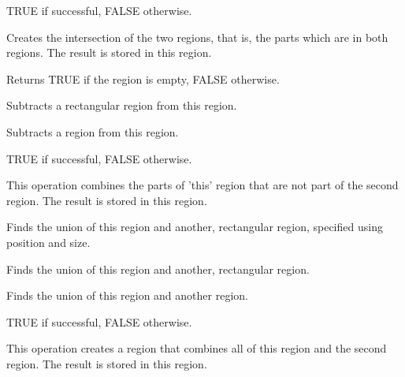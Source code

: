 TRUE if successful, FALSE otherwise.


Creates the intersection of the two regions, that is, the parts which are in both regions. The result
is stored in this region.

\label{wxregionisempty}



Returns TRUE if the region is empty, FALSE otherwise.


Subtracts a rectangular region from this region.


Subtracts a region from this region.


TRUE if successful, FALSE otherwise.


This operation combines the parts of 'this' region that are not part of the second region.
The result is stored in this region.

\label{wxregionunion}


Finds the union of this region and another, rectangular region, specified using position and size.


Finds the union of this region and another, rectangular region.


Finds the union of this region and another region.


TRUE if successful, FALSE otherwise.


This operation creates a region that combines all of this region and the second region.
The result is stored in this region.

\label{wxregionxor}


